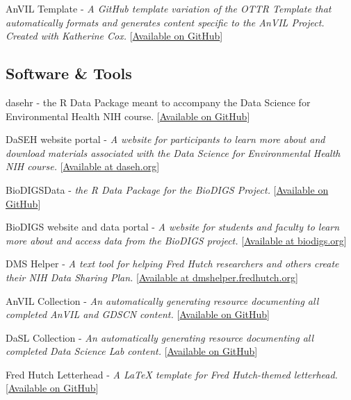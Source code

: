 \documentclass{cv}
\begin{document}
AnVIL Template - \textit{A GitHub template variation of the OTTR Template that automatically formats and generates content specific to the AnVIL Project. Created with Katherine Cox.} [\href{https://github.com/jhudsl/AnVIL_Template}{Available on GitHub}]

\subsection*{Software \& Tools}

dasehr - the R Data Package meant to accompany the Data Science for Environmental Health NIH course. [\href{https://github.com/fhdsl/dasehr}{Available on GitHub}]

DaSEH website portal - \textit{A website for participants to learn more about and download materials associated with the Data Science for Environmental Health NIH course.} [\href{https://daseh.org}{Available at daseh.org}]

BioDIGSData - \textit{the R Data Package for the BioDIGS Project.} [\href{https://github.com/fhdsl/BioDIGSData}{Available on GitHub}]

BioDIGS website and data portal - \textit{A website for students and faculty to learn more about and access data from the BioDIGS project.} [\href{https://biodigs.org}{Available at biodigs.org}]

DMS Helper - \textit{A text tool for helping Fred Hutch researchers and others create their NIH Data Sharing Plan.} [\href{https://dmshelper.fredhutch.org}{Available at dmshelper.fredhutch.org}]

AnVIL Collection - \textit{An automatically generating resource documenting all completed AnVIL and GDSCN content.} [\href{https://github.com/fhdsl/AnVIL_Collection}{Available on GitHub}]

DaSL Collection - \textit{An automatically generating resource documenting all completed Data Science Lab content.} [\href{https://github.com/fhdsl/DaSL_Collection}{Available on GitHub}]

Fred Hutch Letterhead - \textit{A LaTeX template for Fred Hutch-themed letterhead.} [\href{https://github.com/fhdsl/FH_letterhead}{Available on GitHub}]



\newpage
{}
\parttwo

\end{document}
